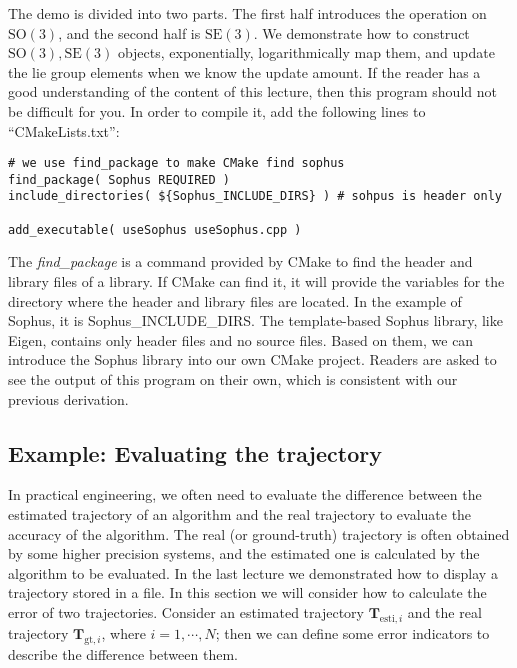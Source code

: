 The demo is divided into two parts. The first half introduces the operation on $\mathrm{SO}(3)$, and the second half is $\mathrm{SE}(3)$. We demonstrate how to construct $\mathrm{SO}(3), \mathrm{SE}(3)$ objects, exponentially, logarithmically map them, and update the lie group elements when we know the update amount. If the reader has a good understanding of the content of this lecture, then this program should not be difficult for you. In order to compile it, add the following lines to ``CMakeLists.txt'':

\begin{lstlisting}[caption=slambook/ch4/useSophus/CMakeLists.txt]
# we use find_package to make CMake find sophus
find_package( Sophus REQUIRED )
include_directories( ${Sophus_INCLUDE_DIRS} ) # sohpus is header only

add_executable( useSophus useSophus.cpp )
\end{lstlisting}

The \textit{find\_package} is a command provided by CMake to find the header and library files of a library. If CMake can find it, it will provide the variables for the directory where the header and library files are located. In the example of Sophus, it is Sophus\_INCLUDE\_DIRS. The template-based Sophus library, like Eigen, contains only header files and no source files. Based on them, we can introduce the Sophus library into our own CMake project. Readers are asked to see the output of this program on their own, which is consistent with our previous derivation.

\subsection{Example: Evaluating the trajectory}
In practical engineering, we often need to evaluate the difference between the estimated trajectory of an algorithm and the real trajectory to evaluate the accuracy of the algorithm. The real (or ground-truth) trajectory is often obtained by some higher precision systems, and the estimated one is calculated by the algorithm to be evaluated. In the last lecture we demonstrated how to display a trajectory stored in a file. In this section we will consider how to calculate the error of two trajectories. Consider an estimated trajectory $\mathbf{T}_{\mathrm{esti}, i}$ and the real trajectory $\mathbf{T}_{\mathrm{gt},i}$, where $i=1,\cdots, N$; then we can define some error indicators to describe the difference between them.

